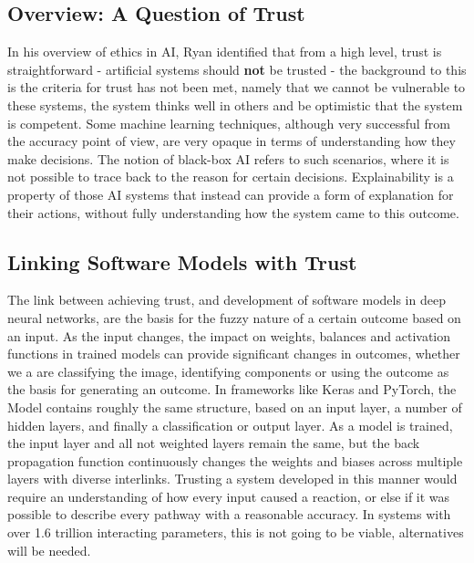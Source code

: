 \subsection{Overview: A Question of Trust}

In his overview of ethics in AI, Ryan \cite{ryanAIWeTrust2020} identified that from a high level, trust is straightforward - artificial systems should \textbf{not} be trusted - the background to this is the criteria for trust has not been met, namely that we cannot be vulnerable to these systems, the system thinks well in others and be optimistic that the system is competent\cite{mcleodTrust2020}. Some machine learning techniques, although very successful from the accuracy point of view, are very opaque in terms of understanding how they make decisions. The notion of black-box AI refers to such scenarios, where it is not possible to trace back to the reason for certain decisions. Explainability is a property of those AI systems that instead can provide a form of explanation for their actions, without fully understanding how the system came to this outcome.

\subsection{Linking Software Models with Trust}
The link between achieving trust, and development of software models in deep neural networks, are the basis for the fuzzy nature of a certain outcome based on an input. As the input changes, the impact on weights, balances and activation functions in trained models can provide significant changes in outcomes, whether we a are classifying the image, identifying components or using the outcome as the basis for generating an outcome\cite{miikkulainenChapter15Evolving2019}. In frameworks like Keras and PyTorch, the Model contains roughly the same structure, based on an input layer, a number of hidden layers, and finally a classification or output layer. As a model is trained, the input layer and all not weighted layers remain the same, but the back propagation function continuously changes the weights and biases across multiple layers with diverse interlinks\cite{hecht-nielsenIIITheoryBackpropagation1992}. Trusting a system developed in this manner would require an understanding of how every input caused a reaction, or else if it was possible to describe every pathway with a reasonable accuracy. In systems with over 1.6 trillion interacting parameters\cite{fedusSwitchTransformersScaling2021}, this is not going to be viable, alternatives will be needed.

